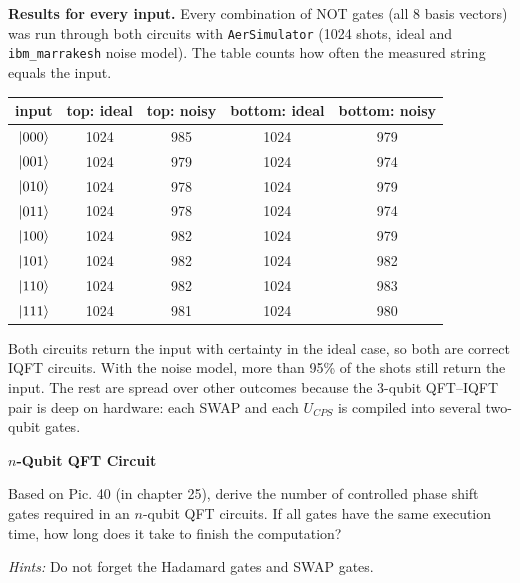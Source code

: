 \documentclass[a4paper, 10pt]{article}
\begin{document}
\begin{solution}
	\noindent \textbf{Results for every input.} Every combination of NOT gates (all 8 basis vectors) was run through both circuits with \texttt{AerSimulator} (1024 shots, ideal and \texttt{ibm\_marrakesh} noise model). The table counts how often the measured string equals the input.
	\begin{center}
		\begin{tabular}{ccccc}
			\toprule
			input           & top: ideal & top: noisy & bottom: ideal & bottom: noisy \\
			\midrule
			\( \ket{000} \) & 1024       & 985        & 1024          & 979           \\
			\( \ket{001} \) & 1024       & 979        & 1024          & 974           \\
			\( \ket{010} \) & 1024       & 978        & 1024          & 979           \\
			\( \ket{011} \) & 1024       & 978        & 1024          & 974           \\
			\( \ket{100} \) & 1024       & 982        & 1024          & 979           \\
			\( \ket{101} \) & 1024       & 982        & 1024          & 982           \\
			\( \ket{110} \) & 1024       & 982        & 1024          & 983           \\
			\( \ket{111} \) & 1024       & 981        & 1024          & 980           \\
			\bottomrule
		\end{tabular}
	\end{center}
	\noindent Both circuits return the input with certainty in the ideal case, so both are correct IQFT circuits. With the noise model, more than 95\% of the shots still return the input.
	The rest are spread over other outcomes because the 3-qubit QFT--IQFT pair is deep on hardware: each SWAP and each \( U_{CPS} \) is compiled into several two-qubit gates.
\end{solution}

\begin{problem}
\textbf{\( n \)-Qubit QFT Circuit}
\par Based on Pic. 40 (in chapter 25), derive the number of controlled phase shift gates required in an \( n \)-qubit QFT circuits.
If all gates have the same execution time, how long does it take to finish the computation?
\par\noindent \textit{Hints:} Do not forget the Hadamard gates and SWAP gates.
\end{problem}
\end{document}
